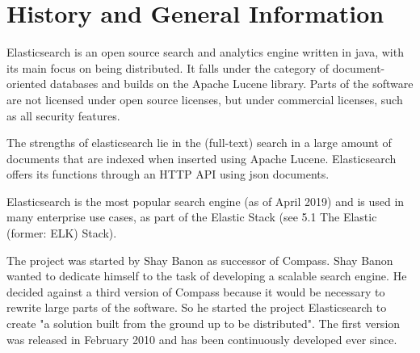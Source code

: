 \chapter{History and General Information}

Elasticsearch is an open source search and analytics engine written in java, with its main focus on being distributed. It falls under the category of document-oriented databases and builds on the Apache Lucene library. Parts of the software are not licensed under open source licenses, but under commercial licenses, such as all security features.

The strengths of elasticsearch lie in the (full-text) search in a large amount of documents that are indexed when inserted using Apache Lucene. Elasticsearch offers its functions through an HTTP API using json documents.

Elasticsearch is the most popular search engine (as of April 2019) and is used in many enterprise use cases, as part of the Elastic Stack (see 5.1 The Elastic (former: ELK) Stack).

The project was started by Shay Banon as successor of Compass. Shay Banon wanted to dedicate himself to the task of developing a scalable search engine. He decided against a third version of Compass because it would be necessary to rewrite large parts of the software. So he started the project Elasticsearch to create "a solution built from the ground up to be distributed". The first version was released in February 2010 and has been continuously developed ever since.
